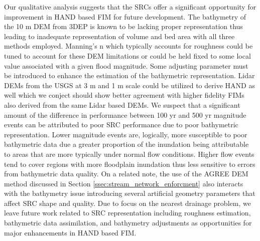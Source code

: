 \documentclass[draft]{dependencies/agujournal2019}
\begin{document}
Our qualitative analysis suggests that the SRCs offer a significant opportunity for improvement in HAND based FIM for future development.
The bathymetry of the 10 m DEM from 3DEP is known to be lacking proper representation thus leading to inadequate representation of volume and bed area with all three methods employed.
Manning's n which typically accounts for roughness could be tuned to account for these DEM limitations or could be held fixed to some local value associated with a given flood magnitude.
Some adjusting parameter must be introduced to enhance the estimation of the bathymetric representation.
Lidar DEMs from the USGS at 3 m and 1 m scale could be utilized to derive HAND as well which we conject should show better agreement with higher fidelity FIMs also derived from the same Lidar based DEMs.
We suspect that a significant amount of the difference in performance between 100 yr and 500 yr magnitude events can be attributed to poor SRC performance due to poor bathymetric representation.
Lower magnitude events are, logically, more susceptible to poor bathymetric data due a greater proportion of the inundation being attributable to areas that are more typically under normal flow conditions.
Higher flow events tend to cover regions with more floodplain inundation thus less sensitive to errors from bathymetric data quality.
On a related note, the use of the AGREE DEM method discussed in Section \ref{ssec:stream_network_enforcment} also interacts with the bathymetry issue introducing several artificial geometry parameters that affect SRC shape and quality.
Due to focus on the nearest drainage problem, we leave future work related to SRC representation including roughness estimation, bathymetric data assimilation, and bathymetry adjustments as opportunities for major enhancements in HAND based FIM.
\end{document}
